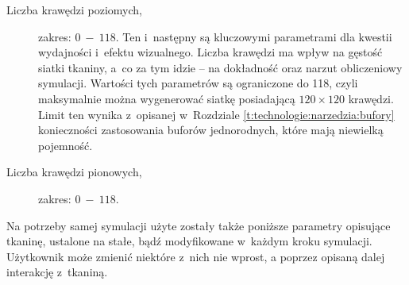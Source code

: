 \begin{description}
				\item[Liczba krawędzi poziomych,] zakres: \(0\ -\ 118\). Ten i~następny są kluczowymi parametrami dla kwestii wydajności i~efektu wizualnego. Liczba krawędzi ma wpływ na gęstość siatki tkaniny, a~co za tym idzie -- na dokładność oraz narzut obliczeniowy symulacji. Wartości tych parametrów są ograniczone do 118, czyli maksymalnie można wygenerować siatkę posiadającą \( 120 \times 120 \) krawędzi. Limit ten wynika z~opisanej w~Rozdziale \ref{t:technologie:narzedzia:bufory} konieczności zastosowania buforów jednorodnych, które mają niewielką pojemność.
				
				\item[Liczba krawędzi pionowych,] zakres: \(0\ -\ 118\).
				
			\end{description}
			
			Na potrzeby samej symulacji użyte zostały także poniższe parametry opisujące tkaninę, ustalone na stałe, bądź modyfikowane w~każdym kroku symulacji. Użytkownik może zmienić niektóre z~nich nie wprost, a poprzez opisaną dalej interakcję z~tkaniną.
			
